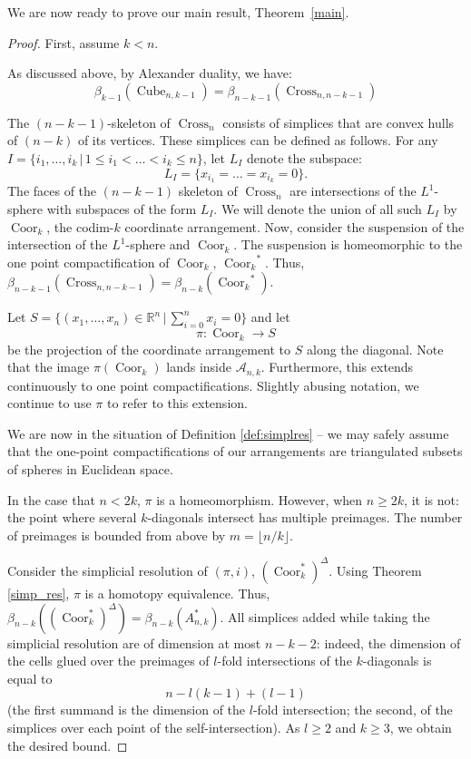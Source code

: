 \documentclass{amsart}
\newcommand{\R}{{\mathbb R}}
\DeclareMathOperator{\Cube}{Cube}
\DeclareMathOperator{\Coor}{Coor}
\DeclareMathOperator{\Cross}{Cross}
\begin{document}
We are now ready to prove our main result, Theorem~\ref{main}.  

\goldbach*

\begin{proof}


  First, assume $k < n$.

  As discussed above, by Alexander duality, we have:
  $$\beta_{k-1}(\Cube_{n, k-1}) = \beta_{n-k-1}(\Cross_{n, n-k-1})$$

  The $(n-k-1)$-skeleton of $\Cross_n$ consists of simplices that are
  convex hulls of $(n-k)$ of its vertices.  These simplices can be defined as follows.   For any $I  = \{i_1, \ldots, i_k \, | \, 1 \leq i_1 < \ldots < i_k \leq n\}$, let $L_I$ denote the subspace:
 $$L_I = \{x_{i_1} = \ldots = x_{i_k} = 0\}.$$  The faces of the $(n-k-1)$ skeleton of $\Cross_n$ are intersections of the $L^1$-sphere with subspaces of the form $L_I$. 
  We will denote the union of all such $L_I$ by $\Coor_k$, the codim-$k$ coordinate arrangement.
Now, consider the suspension of the intersection of the $L^1$-sphere and $\Coor_k$. The suspension is homeomorphic to the one point compactification of $\Coor_k$, ${\Coor_k}^*$. Thus, $\beta_{n-k-1}(\Cross_{n, n-k-1}) = \beta_{n-k}({\Coor_k}^*)$.

Let $S = \{(x_1, \ldots, x_n) \in \R^n \, | \, \sum_{i=0}^n x_i = 0\}$ and
let $$\pi : \Coor_k \rightarrow S$$ be the projection of the coordinate arrangement to $S$ along the diagonal.  
Note that the image $\pi(\Coor_k)$ lands inside $\mathcal{A}_{n, k}$.
Furthermore, this extends continuously to one point compactifications. Slightly abusing notation, we continue to use $\pi$ to refer to this extension.

We are now in the situation of Definition \ref{def:simplres} -- we may safely assume that the one-point compactifications of our arrangements are triangulated subsets of spheres in Euclidean space.

In the case that $n < 2 k$, $\pi$ is a homeomorphism. However, when $n \geq 2 k$, it is not: the point where several $k$-diagonals intersect has multiple preimages. The number of preimages is bounded from above by $m=\lfloor n/k\rfloor$.

Consider the simplicial resolution of $(\pi, i)$, $(\Coor_k^*)^\Delta$. Using Theorem \ref{simp_res}, $\pi$ is a homotopy equivalence. Thus, $\beta_{n-k}((\Coor_k^*)^{\Delta}) = \beta_{n-k} (A_{n, k}^*)$.
All simplices added while taking the simplicial resolution are of dimension at most $n-k-2$: indeed, the dimension of the cells glued over the preimages of $l$-fold intersections of the $k$-diagonals is equal to
$$
n-l(k-1)+(l-1)
$$
(the first summand is the dimension of the $l$-fold intersection; the second, of the simplices over each point of the self-intersection). As $l\geq 2$ and $k\geq 3$, we obtain the desired bound.


\end{proof}
\end{document}
